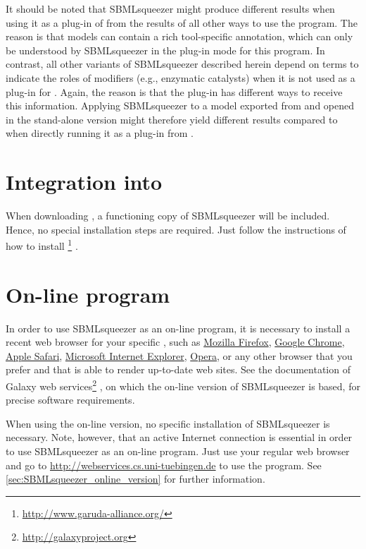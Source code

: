 It should be noted that SBMLsqueezer might produce different results when using it as a plug-in of \CellDesigner from the results of all other ways to use the program.
The reason is that \CellDesigner models can contain a rich tool-specific annotation, which can only be understood by SBMLsqueezer in the plug-in mode for this program.
In contrast, all other variants of SBMLsqueezer described herein depend on \SBO terms to indicate the roles of modifiers (e.g., enzymatic catalysts) when it is not used as a plug-in for \CellDesigner.
Again, the reason is that the \CellDesigner plug-in has different ways to receive this information.
Applying SBMLsqueezer to a model exported from \CellDesigner and opened in the stand-alone version might therefore yield different results compared to when directly running it as a plug-in from \CellDesigner.


\section{Integration into \Garuda}
\label{sec:GarudaInstall}

When downloading \Garuda, a functioning copy of SBMLsqueezer will be included.
Hence, no special installation steps are required. Just follow the instructions
of how to install \Garuda\footnote{\url{http://www.garuda-alliance.org/}} \citep{Ghosh2011}.

\section{On-line program}
\label{sec:WebserviceInstallation}

In order to use SBMLsqueezer as an on-line program, it is necessary to install a recent web browser for your specific \OS, such as \href{http://www.mozilla.org}{Mozilla Firefox}, \href{https://www.google.com/intl/en/chrome/browser/}{Google Chrome}, \href{https://www.apple.com/safari/}{Apple Safari}, \href{http://windows.microsoft.com/en-us/internet-explorer/download-ie}{Microsoft Internet Explorer}, \href{http://www.opera.com/}{Opera}, or any other browser that you prefer and that is able to render up-to-date web sites.
See the documentation of Galaxy web services\footnote{\url{http://galaxyproject.org}} \citep{Goecks2010}, on which the on-line version of SBMLsqueezer is based, for precise software requirements.

When using the on-line version, no specific installation of SBMLsqueezer is necessary.
Note, however, that an active Internet connection is essential in order to use SBMLsqueezer as an on-line program.
Just use your regular web browser and go to \url{http://webservices.cs.uni-tuebingen.de} to use the program.
See \vref{sec:SBMLsqueezer_online_version} for further information.


